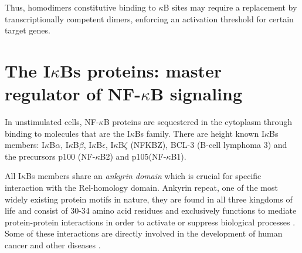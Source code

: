 \documentclass[12pt,a4paper]{report}
\begin{document}
Thus, homodimers constitutive binding to $\kappa$B sites may require a replacement by transcriptionally competent dimers, enforcing an activation threshold for certain target genes.

\section{The I\texorpdfstring{$\kappa$}{}Bs proteins: master regulator of NF-\texorpdfstring{$\kappa$}{}B signaling}\label{IkBs}
In unstimulated cells, NF-$\kappa$B proteins are sequestered in the cytoplasm through binding to molecules that are the I$\kappa$Bs family. There are height known I$\kappa$Bs members: I$\kappa$B$\alpha$, I$\kappa$B$\beta$, I$\kappa$B$\epsilon$, I$\kappa$B$\zeta$ (NFKBZ), BCL-3 (B-cell lymphoma 3) and the precursors p100 (NF-$\kappa$B2) and p105(NF-$\kappa$B1). 

All I$\kappa$Bs members share an \emph{ankyrin domain} which is crucial for specific interaction with the Rel-homology domain. Ankyrin repeat, one of the most widely existing protein motifs in nature, they are found in all three kingdoms of life and consist of 30-34 amino acid residues and exclusively functions to mediate protein-protein interactions in order to activate or suppress biological processes \cite{Ankyrin}. Some of these interactions are directly involved in the development of human cancer and other diseases \cite{AnkyrinMotif}.
\end{document}
